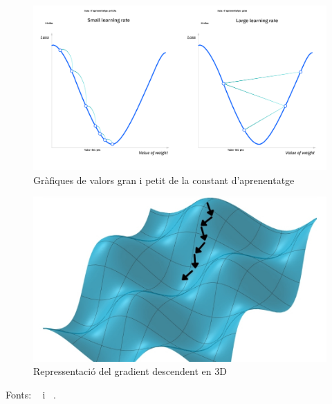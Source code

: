 \begin{enumerate}
\begin{itemize}
\begin{minipage}[h]{0.45\textwidth}
    \begin{figure}[H]
    \centering
    \includegraphics[width=1\textwidth]{./figures/constant_gradient.png}
        \caption{Gràfiques de valors gran i petit de la constant d'aprenentatge}
        \label{Gran i petit}
    \end{figure}
\end{minipage}
\begin{minipage}[h]{0.45\textwidth}
    \begin{figure}[H]
    \centering
    \includegraphics[width=1\textwidth]{./figures/gradient_descendent3d.png}
    \caption{Repressentació del gradient descendent en 3D}
    \end{figure}
\end{minipage}



            Fonts: ~\cite{IBM_Gradient} i ~\cite{Video_Gradient}.
        \end{itemize}


\end{enumerate}
